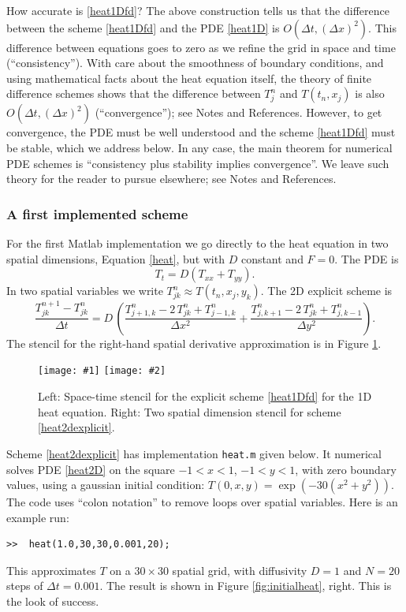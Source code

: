 \documentclass[titlepage,letterpaper,final,12pt]{scrartcl}
\newcommand{\twofigsizes}[5]{
\begin{figure}[ht]
\centering
\texttt{[image: \#1]} \quad
\texttt{[image: \#2]}
\caption{#3}
\label{fig:#1}
\end{figure}}
\newcommand{\twofig}[3]{\twofigsizes{#1}{#2}{#3}{2.5in}{2.5in}}
\begin{document}
How accurate is \eqref{heat1Dfd}?  The above construction tells us that the difference between the scheme \eqref{heat1Dfd} and the PDE \eqref{heat1D} is $O(\Delta t,(\Delta x)^2)$.  This difference between equations goes to zero as we refine the grid in space and time (``consistency'').  With care about the smoothness of boundary conditions, and using mathematical facts about the heat equation itself, the theory of finite difference schemes shows that the difference between $T_j^n$ and $T(t_n,x_j)$ is also $O(\Delta t,(\Delta x)^2)$ (``convergence''); see Notes and References.  However, to get convergence, the PDE must be well understood and the scheme \eqref{heat1Dfd} must be stable, which we address below.  In any case, the main theorem for numerical PDE schemes is ``consistency plus stability implies convergence''.  We leave such theory for the reader to pursue elsewhere; see Notes and References.  %

\subsubsection*{A first implemented scheme}

For the first Matlab implementation we go directly to the heat equation in two spatial dimensions, Equation \eqref{heat}, but with $D$ constant and $F=0$.  The PDE is
\begin{equation}
T_t = D (T_{xx}+T_{yy}).\label{heat2D}
\end{equation}
In two spatial variables we write $T_{jk}^n \approx T(t_n,x_j,y_k)$.  The 2D explicit scheme is
\begin{equation}
	\frac{T_{jk}^{n+1} - T_{jk}^n}{\Delta t} = D\,\left(\frac{T_{j+1,k}^n - 2\, T_{jk}^n + T_{j-1,k}^n}{\Delta x^2} + \frac{T_{j,k+1}^n - 2\, T_{jk}^n + T_{j,k-1}^n}{\Delta y^2}\right). \label{heat2dexplicit}
\end{equation}
The stencil for the right-hand spatial derivative approximation is in Figure \ref{fig:expstencil}.

\twofig{expstencil}{exp2dstencil}{Left: Space-time stencil for the explicit scheme \eqref{heat1Dfd} for the 1D heat equation.  Right: Two spatial dimension stencil for scheme \eqref{heat2dexplicit}.}

Scheme \eqref{heat2dexplicit} has implementation \texttt{heat.m} given below.  It numerical solves PDE \eqref{heat2D} on the square $-1 < x < 1$, $-1 < y < 1$, with zero boundary values, using a gaussian initial condition: $T(0,x,y) = \exp(-30 (x^2+y^2))$.  The code uses ``colon notation'' to remove loops over spatial variables.  Here is an example run:
\begin{Verbatim}
>>  heat(1.0,30,30,0.001,20);
\end{Verbatim}
This approximates $T$ on a $30\times 30$ spatial grid, with diffusivity $D=1$ and $N=20$ steps of $\Delta t = 0.001$.  The result is shown in Figure \ref{fig:initialheat}, right.  This is the look of success.
\end{document}

